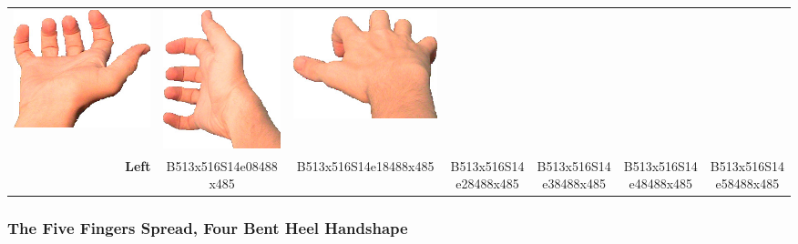 \documentclass{article}
\begin{document}
\begin{center}
\begin{tabular}{r*{6}{c}}
\includegraphics[scale=0.1]{images/05-03-4.jpg}&
\includegraphics[scale=0.1]{images/05-03-5.jpg}&
\includegraphics[scale=0.1]{images/05-03-6.jpg}\\
\textbf{Left}&
B513x516S14e08488x485&
B513x516S14e18488x485&
B513x516S14e28488x485&
B513x516S14e38488x485&
B513x516S14e48488x485&
B513x516S14e58488x485\\
\end{tabular}
\end{center}

\subsubsection{The Five Fingers Spread, Four Bent Heel Handshape}
\end{document}
